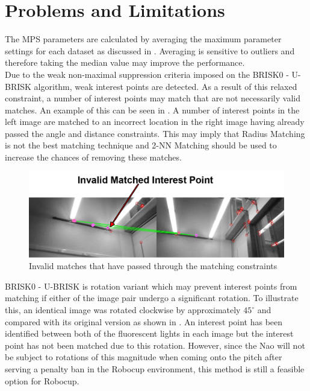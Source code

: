 \section{Problems and Limitations}
\label{sec:problemsLimitations}
The MPS parameters are calculated by averaging the maximum parameter settings for each dataset as discussed in . Averaging is sensitive to outliers and therefore taking the median value may improve the performance.\\

Due to the weak non-maximal suppression criteria imposed on the BRISK0 - U-BRISK algorithm, weak interest points are detected.  As a result of this relaxed constraint, a number of interest points may match that are not necessarily valid matches. An example of this can be seen in . A number of interest points in the left image are matched to an incorrect location in the right image having already passed the angle and distance constraints. This may imply that Radius Matching is not the best matching technique and 2-NN Matching should be used to increase the chances of removing these matches.\\

\begin{figure}
  \centering
    \includegraphics[width=1.0\textwidth]{../Drawings/Matching/dataset_valid_invalid_matches_photo.jpg}
    \caption{Invalid matches that have passed through the matching constraints} 
    \label{fig:weak}
\end{figure}

BRISK0 - U-BRISK is rotation variant which may prevent interest points from matching if either of the image pair undergo a significant rotation. To illustrate this, an identical image was  rotated clockwise by approximately $45^{\circ}$ and compared with its original version as shown in . An interest point has been identified between both of the fluorescent lights in each image but the interest point has not been matched due to this rotation. However, since the Nao will not be subject to rotations of this magnitude when coming onto the pitch after serving a penalty ban in the Robocup environment, this method is still a feasible option for Robocup. \\

